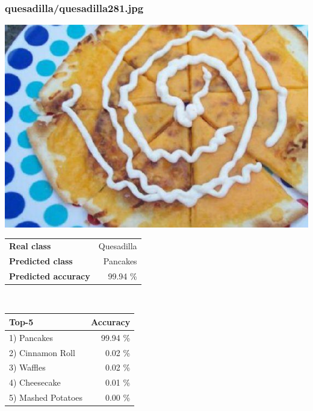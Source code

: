 \subsubsection{quesadilla/quesadilla281.jpg}

\begin{minipage}[t]{0.4\textwidth}
	\vspace{0pt}
	\includegraphics[width=\linewidth]{images/evaluation-images/quesadilla/quesadilla281.jpg}
\end{minipage}
\hfill
\begin{minipage}[t]{0.5\textwidth}
	\vspace{0pt}\raggedright
	\begin{tabularx}{\textwidth}{X r}
		\small \textbf{Real class} & \small Quesadilla\\
		\small \textbf{Predicted class} & \small Pancakes\\
		\small \textbf{Predicted accuracy} & \small 99.94 \%
    \end{tabularx}\\
    
    \vspace{6pt}
	\begin{tabularx}{\textwidth}{X r}
        \small \textbf{Top-5} & \small \textbf{Accuracy} \\
        \hline
		\small 1) Pancakes & \small 99.94 \%\\\small 2) Cinnamon Roll & \small 0.02 \%\\\small 3) Waffles & \small 0.02 \%\\\small 4) Cheesecake & \small 0.01 \%\\\small 5) Mashed Potatoes & \small 0.00 \%
    \end{tabularx}
\end{minipage}
    
